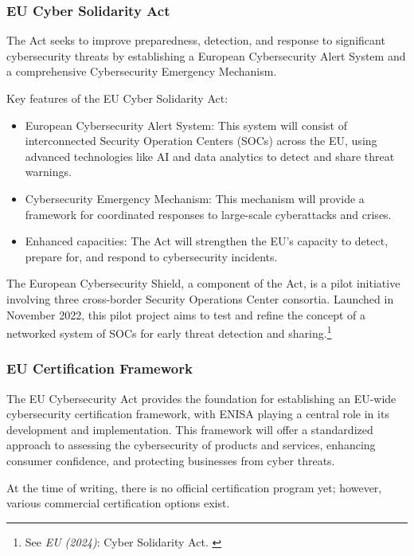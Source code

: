 \subsubsection{EU Cyber Solidarity Act}

The Act seeks to improve preparedness, detection, and response to significant cybersecurity threats by establishing a European Cybersecurity Alert System and a comprehensive Cybersecurity Emergency Mechanism.

Key features of the EU Cyber Solidarity Act:

\begin{itemize}
    \item European Cybersecurity Alert System: This system will consist of interconnected Security Operation Centers (SOCs) across the EU, using advanced technologies like AI and data analytics to detect and share threat warnings.
    \item Cybersecurity Emergency Mechanism: This mechanism will provide a framework for coordinated responses to large-scale cyberattacks and crises.
    \item Enhanced capacities: The Act will strengthen the EU's capacity to detect, prepare for, and respond to cybersecurity incidents.
\end{itemize}

The European Cybersecurity Shield, a component of the Act, is a pilot initiative involving three cross-border Security Operations Center consortia. Launched in November 2022, this pilot project aims to test and refine the concept of a networked system of SOCs for early threat detection and sharing.\footnote{See \textit{EU (2024)}: Cyber Solidarity Act. \cite{cyberSol}}

\subsubsection{EU Certification Framework}

The EU Cybersecurity Act provides the foundation for establishing an EU-wide cybersecurity certification framework, with ENISA playing a central role in its development and implementation. This framework will offer a standardized approach to assessing the cybersecurity of products and services, enhancing consumer confidence, and protecting businesses from cyber threats.

At the time of writing, there is no official certification program yet; however, various commercial certification options exist.

